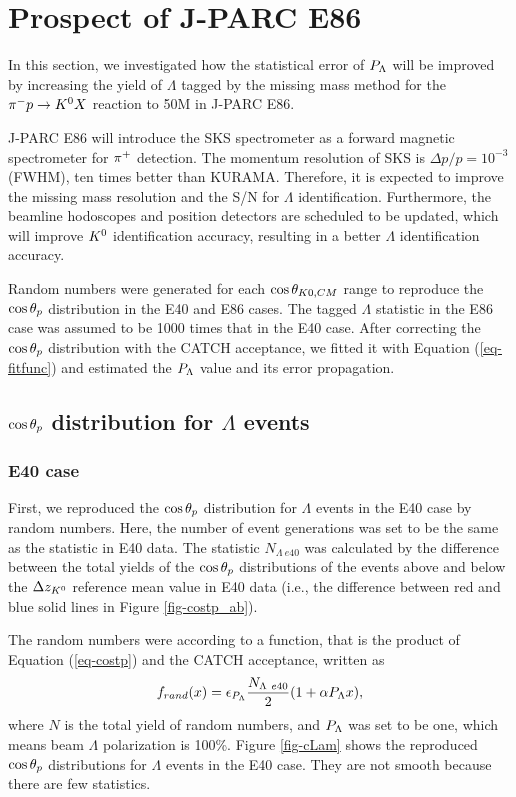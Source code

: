 \clearpage
\section{Prospect of J-PARC E86}
\label{sec-prospect}

In this section, we investigated how the statistical error of $P_{\Lambda}$ will be improved by increasing the yield of $\Lambda$ tagged by the missing mass method for the $\pi^- p \to K^0 X$ reaction to 50M in J-PARC E86. 

J-PARC E86 will introduce the SKS spectrometer \cite{K1.8} as a forward magnetic spectrometer for $\pi^{+}$ detection. The momentum resolution of SKS is $\Delta p/p=10^{-3}$ (FWHM), ten times better than KURAMA. Therefore, it is expected to improve the missing mass resolution and the S/N for $\Lambda$ identification. Furthermore, the beamline hodoscopes and position detectors are scheduled to be updated, which will improve $K^{0}$ identification accuracy, resulting in a better $\Lambda$ identification accuracy.

Random numbers were generated for each $\cos{\theta_{K0,CM}}$ range to reproduce the $\cos{\theta_p}$ distribution in the E40 and E86 cases. The tagged $\Lambda$ statistic in the E86 case was assumed to be 1000 times that in the E40 case. After correcting the $\cos{\theta_p}$ distribution with the CATCH acceptance, we fitted it with Equation (\ref{eq-fitfunc}) and estimated the $P_{\Lambda}$ value and its error propagation.

\subsection{$\cos{\theta_p}$ distribution for $\Lambda$ events}
\label{subsec-randcostpLam}
\subsubsection{E40 case}
First, we reproduced the $\cos{\theta_p}$ distribution for $\Lambda$ events in the E40 case by random numbers. Here, the number of event generations was set to be the same as the statistic in E40 data. The statistic $N_{\Lambda\ e40}$ was calculated by the difference between the total yields of the $\cos{\theta_p}$ distributions of the events above and below the $\Delta z_{K^{0}}$ reference mean value in E40 data (i.e., the difference between red and blue solid lines in Figure \ref{fig-costp_ab}).

The random numbers were according to a function, that is the product of Equation (\ref{eq-costp}) and the CATCH acceptance, written as
\begin{equation}
  f_{rand}(x) = \epsilon_{P_{\Lambda}} \frac{N_{\Lambda\ e40}}{2}(1+\alpha P_{\Lambda} x),
  \label{eq-randfunc}
\end{equation}
where $N$ is the total yield of random numbers, and $P_{\Lambda}$ was set to be one, which means beam $\Lambda$ polarization is 100\%.  Figure \ref{fig-cLam} shows the reproduced $\cos{\theta_p}$ distributions for $\Lambda$ events in the E40 case. They are not smooth because there are few statistics.

